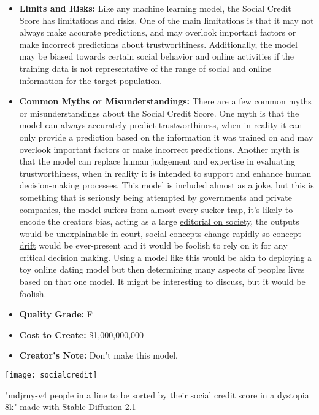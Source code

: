 \begin{itemize}
\begin{itemize}
\begin{enumerate}
        \end{enumerate}
    \item \textbf{Limits and Risks:} Like any machine learning model, the Social Credit Score has limitations and risks. One of the main limitations is that it may not always make accurate predictions, and may overlook important factors or make incorrect predictions about trustworthiness. Additionally, the model may be biased towards certain social behavior and online activities if the training data is not representative of the range of social and online information for the target population.
    \item \textbf{Common Myths or Misunderstandings:} There are a few common myths or misunderstandings about the Social Credit Score. One myth is that the model can always accurately predict trustworthiness, when in reality it can only provide a prediction based on the information it was trained on and may overlook important factors or make incorrect predictions. Another myth is that the model can replace human judgement and expertise in evaluating trustworthiness, when in reality it is intended to support and enhance human decision-making processes. This model is included almost as a joke, but this is something that is seriously being attempted by governments and private companies, the model suffers from almost every sucker trap, it's likely to encode the creators bias, acting as a large \hyperref[sec:janitor]{editorial on society}, the outputs would be \hyperref[sec:explain]{unexplainable} in court, social concepts change rapidly so \hyperref[sec:drift]{concept drift} would be ever-present and it would be foolish to rely on it for any \hyperref[sec:creative]{critical} decision making. Using a model like this would be akin to deploying a toy online dating model but then determining many aspects of peoples lives based on that one model. It might be interesting to discuss, but it would be foolish.
    \item \textbf{Quality Grade:} F
    \item \textbf{Cost to Create:} \$1,000,000,000
    \item \textbf{Creator's Note:} Don't make this model.
\end{itemize}

\begin{marginfigure}[-5.5cm]
        \texttt{[image: socialcredit]}
        \caption{"mdjrny-v4 people in a line to be sorted by their social credit score in a dystopia 8k" made with Stable Diffusion 2.1}
\end{marginfigure}


\end{itemize}
